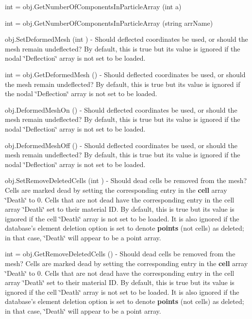 \begin{DoxyItemize}
\item {\ttfamily int = obj.\-Get\-Number\-Of\-Components\-In\-Particle\-Array (int a)}  
\item {\ttfamily int = obj.\-Get\-Number\-Of\-Components\-In\-Particle\-Array (string arr\-Name)}  
\item {\ttfamily obj.\-Set\-Deformed\-Mesh (int )} -\/ Should deflected coordinates be used, or should the mesh remain undeflected? By default, this is true but its value is ignored if the nodal \char`\"{}\-Deflection\char`\"{} array is not set to be loaded.  
\item {\ttfamily int = obj.\-Get\-Deformed\-Mesh ()} -\/ Should deflected coordinates be used, or should the mesh remain undeflected? By default, this is true but its value is ignored if the nodal \char`\"{}\-Deflection\char`\"{} array is not set to be loaded.  
\item {\ttfamily obj.\-Deformed\-Mesh\-On ()} -\/ Should deflected coordinates be used, or should the mesh remain undeflected? By default, this is true but its value is ignored if the nodal \char`\"{}\-Deflection\char`\"{} array is not set to be loaded.  
\item {\ttfamily obj.\-Deformed\-Mesh\-Off ()} -\/ Should deflected coordinates be used, or should the mesh remain undeflected? By default, this is true but its value is ignored if the nodal \char`\"{}\-Deflection\char`\"{} array is not set to be loaded.  
\item {\ttfamily obj.\-Set\-Remove\-Deleted\-Cells (int )} -\/ Should dead cells be removed from the mesh? Cells are marked dead by setting the corresponding entry in the {\bfseries cell} array \char`\"{}\-Death\char`\"{} to 0. Cells that are not dead have the corresponding entry in the cell array \char`\"{}\-Death\char`\"{} set to their material I\-D. By default, this is true but its value is ignored if the cell \char`\"{}\-Death\char`\"{} array is not set to be loaded. It is also ignored if the database's element deletion option is set to denote {\bfseries points} (not cells) as deleted; in that case, \char`\"{}\-Death\char`\"{} will appear to be a point array.  
\item {\ttfamily int = obj.\-Get\-Remove\-Deleted\-Cells ()} -\/ Should dead cells be removed from the mesh? Cells are marked dead by setting the corresponding entry in the {\bfseries cell} array \char`\"{}\-Death\char`\"{} to 0. Cells that are not dead have the corresponding entry in the cell array \char`\"{}\-Death\char`\"{} set to their material I\-D. By default, this is true but its value is ignored if the cell \char`\"{}\-Death\char`\"{} array is not set to be loaded. It is also ignored if the database's element deletion option is set to denote {\bfseries points} (not cells) as deleted; in that case, \char`\"{}\-Death\char`\"{} will appear to be a point array.  

\end{DoxyItemize}

